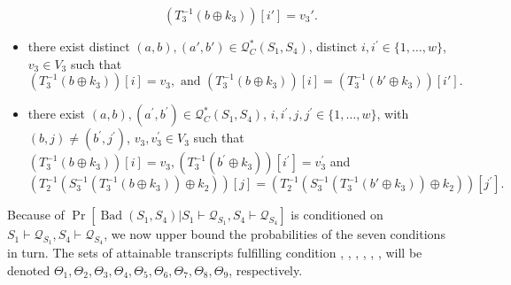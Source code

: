 \begin{itemize}
$$  \left(T_{3}^{-1}\left(b \oplus k_{3}\right)\right)[i'] = v_3'.$$
  \item[\ceight]
  there exist distinct $(a, b),(a',b') \in \mathcal{Q}_{C}^{*}\left(S_{1}, S_{4}\right)$, distinct $i, i^{\prime}\in\{1, \ldots, w\}$, $v_{3} \in V_{3}$ such that
  $$\left(T_{3}^{-1}\left(b \oplus k_{3}\right)\right)[i] = v_3,\text{ and }
 \left(T_{3}^{-1}\left(b \oplus k_{3}\right)\right)[i]=\left(T_{3}^{-1}\left(b' \oplus k_{3}\right)\right)[i'].$$
  \item[\cnine]
  there exist $(a, b), (a^{\prime}, b^{\prime}) \in \mathcal{Q}_{C}^{*}\left(S_{1}, S_{4}\right)$, $i, i^{\prime}, j, j^{\prime} \in\{1, \ldots, w\}$, with$(b, j) \neq \left(b^{\prime}, j^{\prime}\right)$, $v_{3},v_{3}^{\prime} \in V_{3}$ such that $\left(T_{3}^{-1}\left(b \oplus k_{3}\right)\right)[i] = v_3, \left(T_{3}^{-1}\left(b^{\prime} \oplus k_{3}\right)\right)[i^{\prime}] = v_3^{\prime}$ and
$$
  \left(T_{2}^{-1}\left(S_{3}^{-1}\left(T_{3}^{-1}\left(b \oplus k_{3}\right)\right) \oplus k_{2}\right)\right)[j] = \left(T_{2}^{-1}\left(S_{3}^{-1}\left(T_{3}^{-1}\left(b' \oplus k_{3}\right)\right) \oplus k_{2}\right)\right)[j^{\prime}].
$$
\end{itemize}

Because of $\operatorname{Pr}\left[\operatorname{Bad}\left(S_{1},S_{4}\right) | S_{1} \vdash \mathcal{Q}_{S_{1}}, S_{4} \vdash \mathcal{Q}_{S_{4}}\right]$ is conditioned on $S_{1} \vdash \mathcal{Q}_{S_{1}}, S_{4} \vdash \mathcal{Q}_{S_{4}}$, we now upper bound the probabilities of the seven conditions in turn. The sets of attainable transcripts fulfilling condition \cone, \ctwo, \cthree, \cfour, \cfive, \csix, \cseven will be denoted $\Theta_{1}, \Theta_{2}, \Theta_{3}, \Theta_{4}, \Theta_{5}, \Theta_{6}, \Theta_{7}, \Theta_{8}, \Theta_{9}$, respectively.\\

